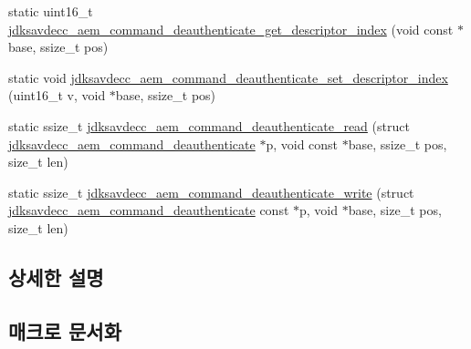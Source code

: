 \begin{DoxyCompactItemize}
static uint16\+\_\+t \hyperlink{group__command__deauthenticate_gafd2657bd985a28f06f45da30c1d64651}{jdksavdecc\+\_\+aem\+\_\+command\+\_\+deauthenticate\+\_\+get\+\_\+descriptor\+\_\+index} (void const $\ast$base, ssize\+\_\+t pos)
\item 
static void \hyperlink{group__command__deauthenticate_ga8e8dec78975974db6d250f1fc0fb3019}{jdksavdecc\+\_\+aem\+\_\+command\+\_\+deauthenticate\+\_\+set\+\_\+descriptor\+\_\+index} (uint16\+\_\+t v, void $\ast$base, ssize\+\_\+t pos)
\item 
static ssize\+\_\+t \hyperlink{group__command__deauthenticate_gafe3aba0484a848936448ebcc8d5e1494}{jdksavdecc\+\_\+aem\+\_\+command\+\_\+deauthenticate\+\_\+read} (struct \hyperlink{structjdksavdecc__aem__command__deauthenticate}{jdksavdecc\+\_\+aem\+\_\+command\+\_\+deauthenticate} $\ast$p, void const $\ast$base, ssize\+\_\+t pos, size\+\_\+t len)
\item 
static ssize\+\_\+t \hyperlink{group__command__deauthenticate_gab111156c760a571f31bc2b8e8bc412d1}{jdksavdecc\+\_\+aem\+\_\+command\+\_\+deauthenticate\+\_\+write} (struct \hyperlink{structjdksavdecc__aem__command__deauthenticate}{jdksavdecc\+\_\+aem\+\_\+command\+\_\+deauthenticate} const $\ast$p, void $\ast$base, size\+\_\+t pos, size\+\_\+t len)
\end{DoxyCompactItemize}


\subsection{상세한 설명}


\subsection{매크로 문서화}
